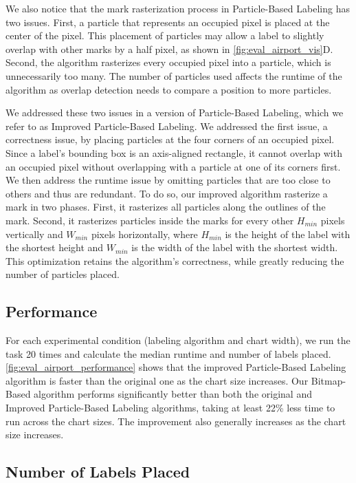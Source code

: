 We also notice that the mark rasterization process in Particle-Based Labeling has two issues.
First, a particle that represents an occupied pixel is placed at the center of the pixel.
This placement of particles may allow a label to slightly overlap with other marks by a half pixel, as shown in \autoref{fig:eval_airport_vis}D.
Second, the algorithm rasterizes every occupied pixel into a particle, which is unnecessarily too many.
The number of particles used affects the runtime of the algorithm as overlap detection needs to compare a position to more particles.

We addressed these two issues in a version of Particle-Based Labeling, which we refer to as Improved Particle-Based Labeling.
We addressed the first issue, a correctness issue, by placing particles at the four corners of an occupied pixel.
Since a label's bounding box is an axis-aligned rectangle, it cannot overlap with an occupied pixel without overlapping with a particle at one of its corners first.
We then address the runtime issue by omitting particles that are too close to others and thus are redundant.
To do so, our improved algorithm rasterize a mark in two phases. 
First, it rasterizes all particles along the outlines of the mark.
Second, it rasterizes particles inside the marks for every other $H_{min}$ pixels vertically and $W_{min}$ pixels horizontally,
where $H_{min}$ is the height of the label with the shortest height and $W_{min}$ is the width of the label with the shortest width.
This optimization retains the algorithm's correctness, while greatly reducing the number of particles placed.

\subsection{Performance}

For each experimental condition (labeling algorithm and chart width), we run the task 20 times and 
calculate the median runtime and number of labels placed.
\autoref{fig:eval_airport_performance} shows that
the improved Particle-Based Labeling algorithm is faster than the original one as the chart size increases.
Our Bitmap-Based algorithm performs significantly better than both the original and Improved Particle-Based Labeling algorithms,
taking at least 22\% less time to run across the chart sizes. 
The improvement also generally increases as the chart size increases.

\subsection{Number of Labels Placed}

